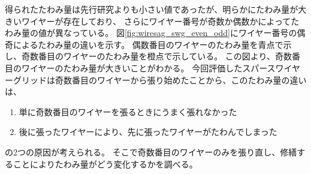 \documentclass[../../main.tex]{subfiles}
\begin{document}
得られたたわみ量は先行研究よりも小さい値であったが、明らかにたわみ量が大きいワイヤーが存在しており、
さらにワイヤー番号が奇数か偶数かによってたわみ量の値が異なっている。
図\ref{fig:wiresag_swg_even_odd}にワイヤー番号の偶奇によるたわみ量の違いを示す。
偶数番目のワイヤーのたわみ量を青点で示し、奇数番目のワイヤーのたわみ量を橙点で示している。
この図より、奇数番目のワイヤーのたわみ量が大きいことがわかる。
今回評価したスパースワイヤーグリッドは奇数番目のワイヤーから張り始めたことから、このたわみ量の違いは、
\begin{enumerate}
    \item 単に奇数番目のワイヤーを張るときにうまく張れなかった
    \item 後に張ったワイヤーにより、先に張ったワイヤーがたわんでしまった
\end{enumerate}
の2つの原因が考えられる。
そこで奇数番目のワイヤーのみを張り直し、修繕することによりたわみ量がどう変化するかを調べる。
\end{document}
